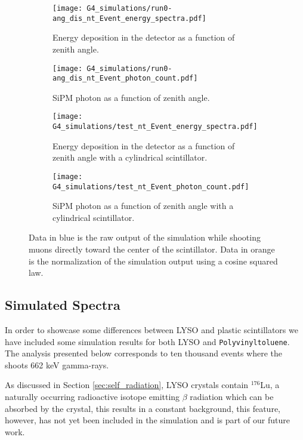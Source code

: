 \begin{figure}[H]
  \centering
  \begin{subfigure}[t]{0.48\textwidth}
    \texttt{[image: G4\_simulations/run0-ang\_dis\_nt\_Event\_energy\_spectra.pdf]}
    \caption{\label{sfig:ang_edep}Energy deposition in the detector as a function of zenith angle.}
  \end{subfigure}
  \hfill
  \begin{subfigure}[t]{0.48\textwidth}
    \texttt{[image: G4\_simulations/run0-ang\_dis\_nt\_Event\_photon\_count.pdf]}
    \caption{\label{sfig:ang_pcount}SiPM photon as a function of zenith angle.}
  \end{subfigure}
  \medskip
  \begin{subfigure}[t]{0.48\textwidth}
    \texttt{[image: G4\_simulations/test\_nt\_Event\_energy\_spectra.pdf]}
    \caption{\label{sfig:ang_edep_cylinder}Energy deposition in the detector as a function of zenith angle with a cylindrical scintillator.}
  \end{subfigure}
  \hfill
  \begin{subfigure}[t]{0.48\textwidth}
    \texttt{[image: G4\_simulations/test\_nt\_Event\_photon\_count.pdf]}
    \caption{\label{sfig:ang_pcount_cylinder}SiPM photon as a function of zenith angle with a cylindrical scintillator.}
  \end{subfigure}
  \caption{\label{fig:ang_results}Data in blue is the raw output of the simulation while shooting muons directly toward the center of the scintillator. Data in orange is the normalization of the simulation output using a cosine squared law.}
\end{figure}

\subsection{Simulated Spectra}\label{sec:simulated_spectra}

In order to showcase some differences between LYSO and plastic scintillators we have included some simulation results for both LYSO and \texttt{Polyvinyltoluene}. The analysis presented below corresponds to ten thousand events where the \gps shoots 662 \unit{\kilo\eV} gamma-rays.

As discussed in Section \ref{sec:self_radiation}, LYSO crystals contain $^{176}$Lu, a naturally occurring radioactive isotope emitting $\beta$ radiation which can be absorbed by the crystal, this results in a constant background, this feature, however, has not yet been included in the simulation and is part of our future work.

